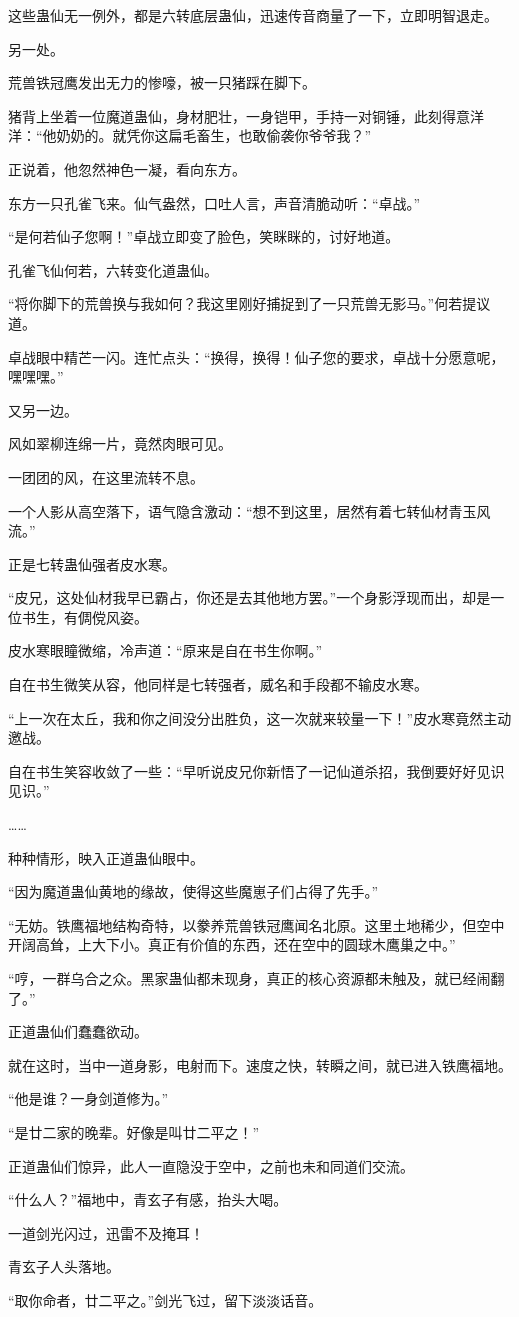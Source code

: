 \begin{this_body}
这些蛊仙无一例外，都是六转底层蛊仙，迅速传音商量了一下，立即明智退走。

另一处。

荒兽铁冠鹰发出无力的惨嚎，被一只猪踩在脚下。

猪背上坐着一位魔道蛊仙，身材肥壮，一身铠甲，手持一对铜锤，此刻得意洋洋：“他奶奶的。就凭你这扁毛畜生，也敢偷袭你爷爷我？”

正说着，他忽然神色一凝，看向东方。

东方一只孔雀飞来。仙气盎然，口吐人言，声音清脆动听：“卓战。”

“是何若仙子您啊！”卓战立即变了脸色，笑眯眯的，讨好地道。

孔雀飞仙何若，六转变化道蛊仙。

“将你脚下的荒兽换与我如何？我这里刚好捕捉到了一只荒兽无影马。”何若提议道。

卓战眼中精芒一闪。连忙点头：“换得，换得！仙子您的要求，卓战十分愿意呢，嘿嘿嘿。”

又另一边。

风如翠柳连绵一片，竟然肉眼可见。

一团团的风，在这里流转不息。

一个人影从高空落下，语气隐含激动：“想不到这里，居然有着七转仙材青玉风流。”

正是七转蛊仙强者皮水寒。

“皮兄，这处仙材我早已霸占，你还是去其他地方罢。”一个身影浮现而出，却是一位书生，有倜傥风姿。

皮水寒眼瞳微缩，冷声道：“原来是自在书生你啊。”

自在书生微笑从容，他同样是七转强者，威名和手段都不输皮水寒。

“上一次在太丘，我和你之间没分出胜负，这一次就来较量一下！”皮水寒竟然主动邀战。

自在书生笑容收敛了一些：“早听说皮兄你新悟了一记仙道杀招，我倒要好好见识见识。”

……

种种情形，映入正道蛊仙眼中。

“因为魔道蛊仙黄地的缘故，使得这些魔崽子们占得了先手。”

“无妨。铁鹰福地结构奇特，以豢养荒兽铁冠鹰闻名北原。这里土地稀少，但空中开阔高耸，上大下小。真正有价值的东西，还在空中的圆球木鹰巢之中。”

“哼，一群乌合之众。黑家蛊仙都未现身，真正的核心资源都未触及，就已经闹翻了。”

正道蛊仙们蠢蠢欲动。

就在这时，当中一道身影，电射而下。速度之快，转瞬之间，就已进入铁鹰福地。

“他是谁？一身剑道修为。”

“是廿二家的晚辈。好像是叫廿二平之！”

正道蛊仙们惊异，此人一直隐没于空中，之前也未和同道们交流。

“什么人？”福地中，青玄子有感，抬头大喝。

一道剑光闪过，迅雷不及掩耳！

青玄子人头落地。

“取你命者，廿二平之。”剑光飞过，留下淡淡话音。

\end{this_body}

